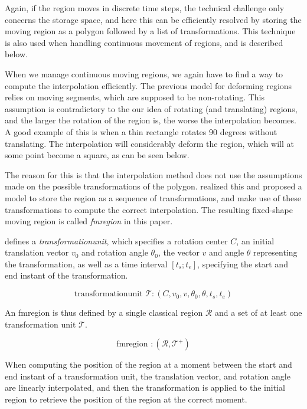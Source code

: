 Again, if the region moves in discrete time steps, the technical challenge only concerns the storage space, and here this can be efficiently resolved by storing the moving region as a polygon followed by a list of transformations. This technique is also used when handling continuous movement of regions, and is described below.

When we manage continuous moving regions, we again have to find a way to compute the interpolation efficiently. The previous model for deforming regions relies on moving segments, which are supposed to be non-rotating. This assumption is contradictory to the our idea of rotating (and translating) regions, and the larger the rotation of the region is, the worse the interpolation becomes. A good example of this is when a thin rectangle rotates 90 degrees without translating. The interpolation will considerably deform the region, which will at some point become a square, as can be seen below.


The reason for this is that the interpolation method does not use the assumptions made on the possible transformations of the polygon.  realized this and proposed a model to store the region as a sequence of transformations, and make use of these transformations to compute the correct interpolation. The resulting fixed-shape moving region is called \textit{fmregion} in this paper.

 defines a \textit{transformationunit}, which specifies a rotation center $C$, an initial translation vector $v_0$ and rotation angle $\theta_0$, the vector $v$ and angle $\theta$ representing the transformation, as well as a time interval $[t_s; t_e]$, specifying the start and end instant of the transformation.

\[
    \text{transformationunit } \mathcal{T}: (C, v_0, v, \theta_0, \theta, t_{s}, t_{e})
\]

An fmregion is thus defined by a single classical region $\mathcal{R}$ and a set of at least one transformation unit $\mathcal{T}$.

\[
    \text{fmregion } : (\mathcal{R}, \mathcal{T}^{+})
\]

When computing the position of the region at a moment between the start and end instant of a transformation unit, the translation vector, and rotation angle are linearly interpolated, and then the transformation is applied to the initial region to retrieve the position of the region at the correct moment.

